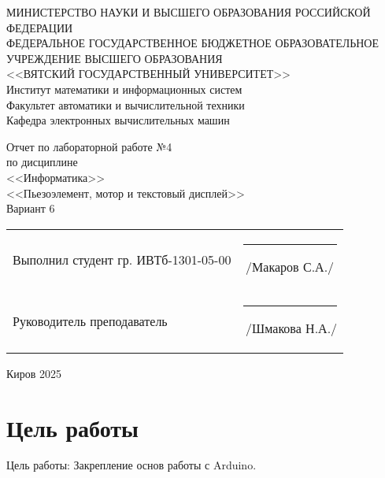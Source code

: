 \documentclass[a4paper,14pt]{extarticle}
\begin{document}
  \newpage\thispagestyle{empty}
  \begin{center}
    \MakeUppercase{
      Министерство науки и высшего образования Российской Федерации\\
      Федеральное государственное бюджетное образовательное учреждение высшего образования\\
      <<Вятский Государственный Университет>>\\
    }
    Институт математики и информационных систем\\
    Факультет автоматики и вычислительной техники\\
    Кафедра электронных вычислительных машин
  \end{center}
  \vfill

  \begin{center}
    Отчет по лабораторной работе №4\\
    по дисциплине\\
    <<Информатика>>\\
    <<Пьезоэлемент, мотор и текстовый дисплей>>\\
    Вариант 6
  \end{center}
  \vfill

  \noindent
  \begin{tabular}{ll}
    Выполнил студент гр. ИВТб-1301-05-00 \hspace{5mm} & \rule[-1mm]{25mm}{0.10mm}\,/Макаров С.А./ \\
    Руководитель преподаватель & \rule[-1mm]{25mm}{0.10mm}\,/Шмакова Н.А./ \\
  \end{tabular}

  \vfill
  \begin{center}
    Киров 2025
  \end{center}

  \newpage
  \section*{\hspace{12.5mm}Цель работы}
  Цель работы: Закрепление основ работы с Arduino.
\end{document}
